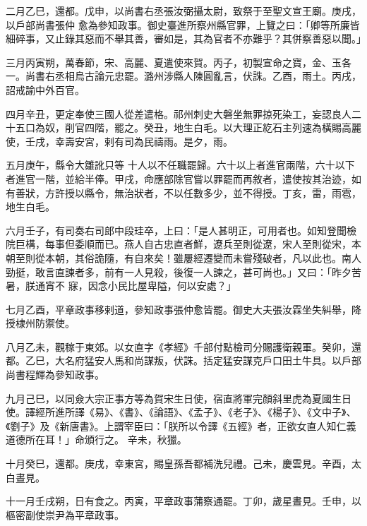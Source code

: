 \begin{pinyinscope}
 二月乙巳，還都。戊申，以尚書右丞張汝弼攝太尉，致祭于至聖文宣王廟。庚戌，以戶部尚書張仲
 愈為參知政事。御史臺進所察州縣官罪，上覽之曰：「卿等所廉皆細碎事，又止錄其惡而不舉其善，審如是，其為官者不亦難乎？其併察善惡以聞。」



 三月丙寅朔，萬春節，宋、高麗、夏遣使來賀。丙子，初製宣命之寶，金、玉各一。尚書右丞相烏古論元忠罷。潞州涉縣人陳圓亂言，伏誅。乙酉，雨土。丙戌，詔戒諭中外百官。



 四月辛丑，更定奉使三國人從差遣格。祁州刺史大磐坐無罪掠死染工，妄認良人二十五口為奴，削官四階，罷之。癸丑，地生白毛。以大理正紇石主列速為橫賜高麗使，壬戌，幸壽安宮，剌有司為民禱雨。是夕，雨。



 五月庚午，縣令大雛訛只等
 十人以不任職罷歸。六十以上者進官兩階，六十以下者進官一階，並給半俸。甲戌，命應部除官嘗以罪罷而再敘者，遣使按其治迹，如有善狀，方許授以縣令，無治狀者，不以任數多少，並不得授。丁亥，雷，雨雹，地生白毛。



 六月壬子，有司奏右司郎中段珪卒，上曰：「是人甚明正，可用者也。如知登聞檢院巨構，每事但委順而已。燕人自古忠直者鮮，遼兵至則從遼，宋人至則從宋，本朝至則從本朝，其俗詭隨，有自來矣！雖屢經遷變而未嘗殘破者，凡以此也。南人勁挺，敢言直諫者多，前有一人見殺，後復一人諫之，甚可尚也。」又曰：「昨夕苦暑，朕通宵不
 寐，因念小民比屋卑隘，何以安處？」



 七月乙酉，平章政事移剌道，參知政事張仲愈皆罷。御史大夫張汝霖坐失糾舉，降授棣州防禦使。



 八月乙未，觀稼于東郊。以女直字《孝經》千部付點檢司分賜護衛親軍。癸卯，還都。乙巳，大名府猛安人馬和尚謀叛，伏誅。括定猛安謀克戶口田土牛具。以戶部尚書程輝為參知政事。



 九月己巳，以同僉大宗正事方等為賀宋生日使，宿直將軍完顏斜里虎為夏國生日使。譯經所進所譯《易》、《書》、《論語》、《孟子》、《老子》、《楊子》、《文中子》、《劉子》及《新唐書》。上謂宰臣曰：「朕所以令譯《五經》者，正欲女直人知仁義道德所在耳！」命頒行之。
 辛未，秋獵。



 十月癸巳，還都。庚戌，幸東宮，賜皇孫吾都補洗兒禮。己未，慶雲見。辛酉，太白晝見。



 十一月壬戌朔，日有食之。丙寅，平章政事蒲察通罷。丁卯，歲星晝見。壬申，以樞密副使崇尹為平章政事。




\end{pinyinscope}
